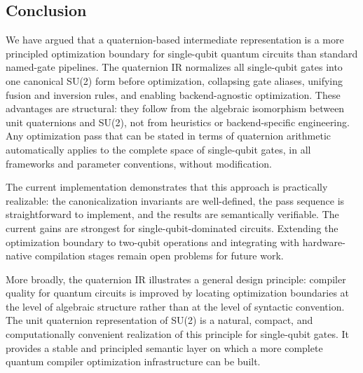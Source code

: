 \documentclass[conference]{IEEEtran}
\begin{document}
\subsection{Conclusion}

We have argued that a quaternion-based intermediate representation is a more principled
optimization boundary for single-qubit quantum circuits than standard named-gate pipelines.
The quaternion IR normalizes all single-qubit gates into one canonical SU(2) form before
optimization, collapsing gate aliases, unifying fusion and inversion rules, and enabling
backend-agnostic optimization. These advantages are structural: they follow from the
algebraic isomorphism between unit quaternions and SU(2), not from heuristics or
backend-specific engineering. Any optimization pass that can be stated in terms of quaternion
arithmetic automatically applies to the complete space of single-qubit gates, in all
frameworks and parameter conventions, without modification.

The current implementation demonstrates that this approach is practically realizable:
the canonicalization invariants are well-defined, the pass sequence is straightforward
to implement, and the results are semantically verifiable. The current gains are strongest
for single-qubit-dominated circuits. Extending the optimization boundary to two-qubit
operations and integrating with hardware-native compilation stages remain open problems
for future work.

More broadly, the quaternion IR illustrates a general design principle: compiler quality
for quantum circuits is improved by locating optimization boundaries at the level of
algebraic structure rather than at the level of syntactic convention. The unit quaternion
representation of SU(2) is a natural, compact, and computationally convenient realization
of this principle for single-qubit gates. It provides a stable and principled semantic
layer on which a more complete quantum compiler optimization infrastructure can be built.
\end{document}

